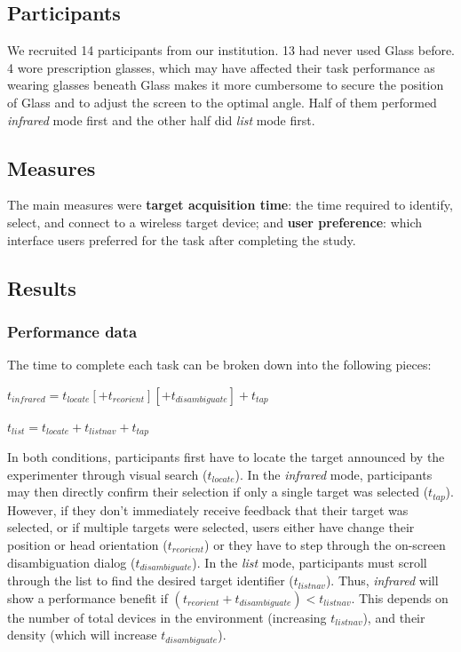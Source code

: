 \documentclass{sigchi}
\begin{document}
\subsection{Participants}
We recruited 14 participants from our institution. 13 had never used Glass before. 4 wore prescription glasses, which may have affected their task performance as wearing glasses beneath Glass makes it more cumbersome to secure the position of Glass and to adjust the screen to the optimal angle. Half of them performed {\em infrared} mode first and the other half did {\em list} mode first.

\subsection{Measures}
The main measures were {\bf target acquisition time}: the time required to identify, select, and connect to a wireless target device; and {\bf user preference}: which interface users preferred for the task after completing the study.

\subsection{Results}
\subsubsection{Performance data}
The time to complete each task can be broken down into the following pieces:

$t_{infrared}=t_{locate}[+t_{reorient}][+t_{disambiguate}]+t_{tap}$

$t_{list}=t_{locate}+t_{listnav}+t_{tap}$

In both conditions, participants first have to locate the target announced by the experimenter through visual search ($t_{locate}$). In the {\em infrared} mode, participants may then directly confirm their selection if only a single target was selected ($t_{tap}$). However, if they don't immediately receive feedback that their target was selected, or if multiple targets were selected, users either have change their position or head orientation ($t_{reorient}$) or they have to step through the on-screen disambiguation dialog ($t_{disambiguate}$). In the {\em list} mode, participants must scroll through the list to find the desired target identifier ($t_{listnav}$).
Thus, {\em infrared} will show a performance benefit if $(t_{reorient}+t_{disambiguate})<t_{listnav}$. This depends on the number of total devices in the environment (increasing $t_{listnav}$), and their density (which will increase $t_{disambiguate}$). 
\end{document}
